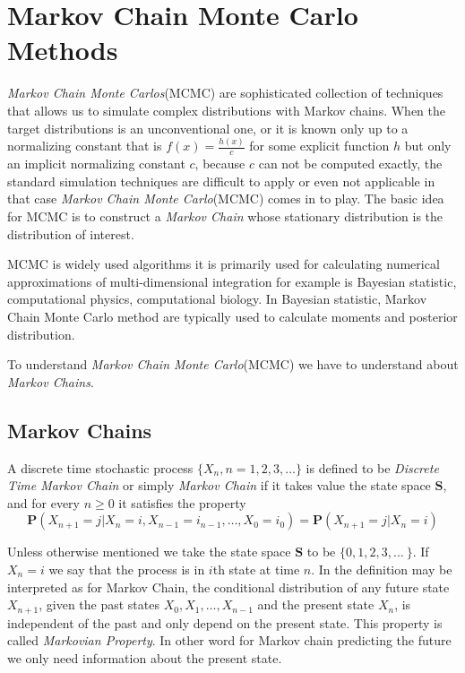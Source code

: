 \chapter{Markov Chain Monte Carlo Methods}

\textit{Markov Chain Monte Carlos}(MCMC) are sophisticated collection of techniques that allows us to simulate complex distributions with Markov chains. 
When the target distributions is an unconventional one, or it is known only up to a normalizing constant that is $ f(x) = \frac{h(x)}{c} $ for some explicit function $ h $ but only an implicit normalizing constant $ c $, because $ c $ can not be computed exactly, the standard simulation techniques are difficult to apply or even not applicable in that case \textit{Markov Chain Monte Carlo}(MCMC) comes in to play.
The basic idea for MCMC is to construct a \textit{Markov Chain} whose stationary distribution is the distribution of interest.

MCMC is widely used algorithms it is primarily used for calculating numerical approximations  of multi-dimensional integration for example is Bayesian statistic, computational physics, computational biology.
In Bayesian statistic, Markov Chain Monte Carlo method are typically used to calculate moments and posterior distribution.

To understand \textit{Markov Chain Monte Carlo}(MCMC) we have to understand about \textit{Markov Chains}.  

\section{Markov Chains}

\begin{definition}
    A discrete time stochastic process $\{X_n,n=1,2,3,\ldots\}$ is defined to be \textit{Discrete Time Markov Chain} or simply \textit{Markov Chain}
    if it takes value  the state space $ \mathbf{S} $, and for every
    $n\ge 0$ it satisfies the property
    \begin{equation}
        \label{Markov property}
         \mathbf{P}( X_{n+1} = j | X_n =i , X_{n-1} = i_{n-1}, \ldots, X_0 = i_0 ) = \mathbf{P}( X_{n+1} = j | X_n =i )
    \end{equation}
\end{definition}

Unless otherwise mentioned we take the state space $ \mathbf{S} $ to be $\{0, 1, 2, 3, \ldots\ \} $. 
If $X_n = i $ we say that the process is in $i $th state at time $n$.
In the definition  may be interpreted as for Markov Chain, the conditional distribution of any future state $ X_{n+1} $, given the past states  $ X_0, X_1,\ldots, X_{n-1} $  and the present state $ X_n $, is independent of the past and only depend on the present state.
This property is called \textit{Markovian Property}. In other word for Markov chain predicting the future we only need information about the present state.

